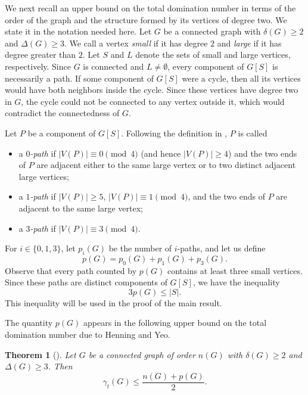 \documentclass[12pt]{article}
\newtheorem{theorem}{Theorem}
\begin{document}
We next recall an upper bound on the total domination number in terms of the order of the graph and the structure formed by its vertices of degree two. We state it in the notation needed here. Let $G$ be a connected graph with $\delta(G)\ge2$ and $\Delta(G)\ge3$. We call a vertex \emph{small} if it has degree $2$ and \emph{large} if it has degree greater than $2$. Let $S$ and $L$ denote the sets of small and large vertices, respectively. Since $G$ is connected and $L\ne\emptyset$, every component of $G[S]$ is necessarily a path. If some component of $G[S]$ were a cycle, then all its vertices would have both neighbors inside the cycle. Since these vertices have degree two in $G$, the cycle could not be connected to any vertex outside it, which would contradict the connectedness of $G$.

Let $P$ be a component of $G[S]$. Following the definition in \cite{HenningYeo2007}, $P$ is called
\begin{itemize}
    \item a \emph{$0$-path} if $|V(P)|\equiv0\pmod4$ (and hence $|V(P)|\ge 4$) and the two ends of $P$ are adjacent either to the same large vertex or to two distinct adjacent large vertices;
    \item a \emph{$1$-path} if $|V(P)|\ge5$, $|V(P)|\equiv1\pmod4$, and the two ends of $P$ are adjacent to the same large vertex;
    \item a \emph{$3$-path} if $|V(P)|\equiv3\pmod4$.
\end{itemize}
For $i\in\{0,1,3\}$, let $p_i(G)$ be the number of $i$-paths, and let us define
$$p(G)=p_0(G)+p_1(G)+p_3(G).$$
Observe that every path counted by $p(G)$ contains at least three small vertices. Since these paths are distinct components of $G[S]$, we have the inequality
\begin{equation}\label{eq:p-s}
3p(G)\le |S|.
\end{equation}
This inequality will be used in the proof of the main result.

The quantity $p(G)$ appears in the following upper bound on the total domination number due to Henning and Yeo.

\begin{theorem}[\cite{HenningYeo2007}]\label{thm:HY}
Let $G$ be a connected graph of order $n(G)$ with $\delta(G)\ge 2$ and $\Delta(G)\ge 3$. Then
$$\gamma_t(G)\le \frac{n(G)+p(G)}{2}.$$
\end{theorem}

\end{document}
